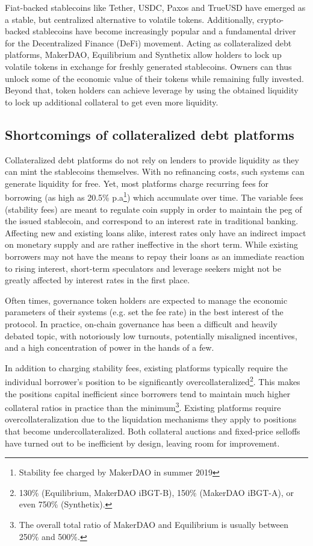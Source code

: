 \documentclass{article}
\begin{document}
Fiat-backed stablecoins like Tether, USDC, Paxos and TrueUSD have emerged as a stable, but centralized alternative to volatile tokens. Additionally, crypto-backed stablecoins have become increasingly popular and a fundamental driver for the Decentralized Finance (DeFi) movement. Acting as collateralized debt platforms, MakerDAO, Equilibrium and Synthetix allow holders to lock up volatile tokens in exchange for freshly generated stablecoins. Owners can thus unlock some of the economic value of their tokens while remaining fully invested. Beyond that, token holders can achieve leverage by using the obtained liquidity to lock up additional collateral to get even more liquidity.
\subsection{Shortcomings of collateralized debt platforms}
Collateralized debt platforms do not rely on lenders to provide liquidity as they can mint the stablecoins themselves. With no refinancing costs, such systems can generate liquidity for free. Yet, most platforms charge recurring fees for borrowing (as high as 20.5\% p.a\footnote{Stability fee charged by MakerDAO in summer 2019}) which accumulate over time. The variable fees (stability fees) are meant to regulate coin supply in order to maintain the peg of the issued stablecoin, and correspond to an interest rate in traditional banking. Affecting new and existing loans alike, interest rates only have an indirect impact on monetary supply and are rather ineffective in the short term. While existing borrowers may not have the means to repay their loans as an immediate reaction to rising interest, short-term speculators and leverage seekers might not be greatly affected by interest rates in the first place.

Often times, governance token holders are expected to manage the economic parameters of their systems (e.g. set the fee rate) in the best interest of the protocol. In practice, on-chain governance has been a difficult and heavily debated topic, with notoriously low turnouts, potentially misaligned incentives, and a high concentration of power in the hands of a few.

In addition to charging stability fees, existing platforms typically require the individual borrower’s position to be significantly overcollateralized\footnote{130\% (Equilibrium, MakerDAO iBGT-B), 150\% (MakerDAO iBGT-A), or even 750\% (Synthetix).}. This makes the positions capital inefficient since borrowers tend to maintain much higher collateral ratios in practice than the minimum\footnote{The overall total ratio of MakerDAO and Equilibrium is usually between 250\% and 500\%.}. Existing platforms require overcollateralization due to the liquidation mechanisms they apply to positions that become undercollateralized. Both collateral auctions and fixed-price selloffs have turned out to be inefficient by design, leaving room for improvement.
\end{document}
